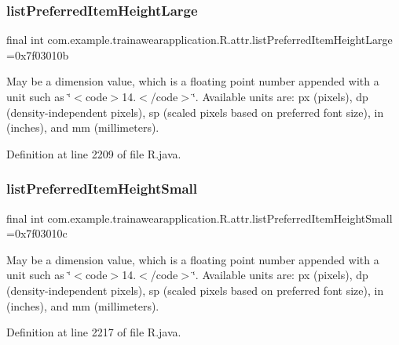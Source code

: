 \subsubsection{\texorpdfstring{listPreferredItemHeightLarge}{listPreferredItemHeightLarge}}
{\footnotesize\ttfamily final int com.\+example.\+trainawearapplication.\+R.\+attr.\+list\+Preferred\+Item\+Height\+Large =0x7f03010b\hspace{0.3cm}{\ttfamily [static]}}

May be a dimension value, which is a floating point number appended with a unit such as \char`\"{}$<$code$>$14.\+5sp$<$/code$>$\char`\"{}. Available units are\+: px (pixels), dp (density-\/independent pixels), sp (scaled pixels based on preferred font size), in (inches), and mm (millimeters). 

Definition at line 2209 of file R.\+java.

\mbox{\label{classcom_1_1example_1_1trainawearapplication_1_1_r_1_1attr_a98188019936b3cd23163b19d8bae3a55}} 
\subsubsection{\texorpdfstring{listPreferredItemHeightSmall}{listPreferredItemHeightSmall}}
{\footnotesize\ttfamily final int com.\+example.\+trainawearapplication.\+R.\+attr.\+list\+Preferred\+Item\+Height\+Small =0x7f03010c\hspace{0.3cm}{\ttfamily [static]}}

May be a dimension value, which is a floating point number appended with a unit such as \char`\"{}$<$code$>$14.\+5sp$<$/code$>$\char`\"{}. Available units are\+: px (pixels), dp (density-\/independent pixels), sp (scaled pixels based on preferred font size), in (inches), and mm (millimeters). 

Definition at line 2217 of file R.\+java.

\mbox{\label{classcom_1_1example_1_1trainawearapplication_1_1_r_1_1attr_adb22c37aad7960e0fe9b86037f396779}} 
